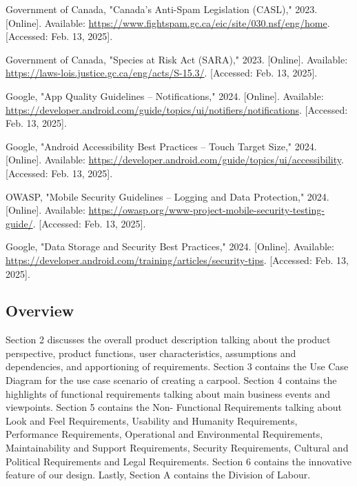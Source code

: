 \documentclass[]{article}
\begin{document}
\begin{thebibliography}{9}
     Government of Canada, "Canada’s Anti-Spam Legislation (CASL)," 2023. [Online]. Available: \url{https://www.fightspam.gc.ca/eic/site/030.nsf/eng/home}. [Accessed: Feb. 13, 2025].

     Government of Canada, "Species at Risk Act (SARA)," 2023. [Online]. Available: \url{https://laws-lois.justice.gc.ca/eng/acts/S-15.3/}. [Accessed: Feb. 13, 2025].

     Google, "App Quality Guidelines – Notifications," 2024. [Online]. Available: \url{https://developer.android.com/guide/topics/ui/notifiers/notifications}. [Accessed: Feb. 13, 2025].

     Google, "Android Accessibility Best Practices – Touch Target Size," 2024. [Online]. Available: \url{https://developer.android.com/guide/topics/ui/accessibility}. [Accessed: Feb. 13, 2025].

     OWASP, "Mobile Security Guidelines – Logging and Data Protection," 2024. [Online]. Available: \url{https://owasp.org/www-project-mobile-security-testing-guide/}. [Accessed: Feb. 13, 2025].

     Google, "Data Storage and Security Best Practices," 2024. [Online]. Available: \url{https://developer.android.com/training/articles/security-tips}. [Accessed: Feb. 13, 2025].

\end{thebibliography}

\subsection{Overview}
\label{sub:overview}
Section 2 discusses the overall product description talking about the product perspective, product functions,
user characteristics, assumptions and dependencies, and apportioning of requirements. Section 3 contains
the Use Case Diagram for the use case scenario of creating a carpool. Section 4 contains the highlights of
functional requirements talking about main business events and viewpoints. Section 5 contains the Non-
Functional Requirements talking about Look and Feel Requirements, Usability and Humanity Requirements,
Performance Requirements, Operational and Environmental Requirements, Maintainability and Support
Requirements, Security Requirements, Cultural and Political Requirements and Legal Requirements. Section
6 contains the innovative feature of our design. Lastly, Section A contains the Division of Labour.
\end{document}

